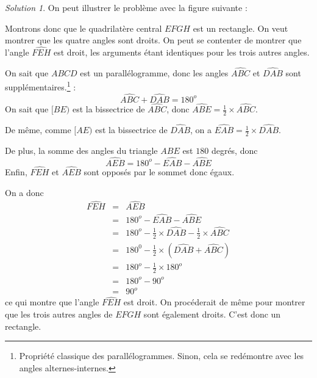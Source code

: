 \documentclass[14pt]{article}
\theoremstyle{remark}
\newtheorem*{sol}{Solution}
\newcounter{n}
\theoremstyle{plain}
\begin{document}
\begin{sol}
On peut illustrer le problème avec la figure suivante : 

\begin{figure}[H]\center
{}
\end{figure}

Montrons donc que le quadrilatère central $EFGH$ est un rectangle. On veut montrer que les quatre angles sont droits. On peut se contenter de montrer que l'angle $\widehat{FEH}$ est droit, les arguments étant identiques pour les trois autres angles.

On sait que $ABCD$ est un parallélogramme, donc les angles $\widehat{ABC}$ et $\widehat{DAB}$ sont supplémentaires.\footnote{Propriété classique des parallélogrammes. Sinon, cela se redémontre avec les angles alternes-internes.} : 
\[ \widehat{ABC}+\widehat{DAB}=180^o\]
On sait que $[BE)$ est la bissectrice de $\widehat{ABC}$, donc $\widehat{ABE}= \frac12\times \widehat{ABC}$. 

De même, comme $[AE)$ est la bissectrice de $\widehat{DAB}$, on a $\widehat{EAB} =\frac12\times \widehat{DAB}$.

De plus, la somme des angles du triangle $ABE$ est $180$ degrés, donc 
 \[\widehat{AEB}= 180^o-\widehat{EAB}-\widehat{ABE}\]
 Enfin, $\widehat{FEH}$ et $\widehat{AEB}$ sont opposés par le sommet donc égaux.
 
On a donc \begin{eqnarray*}
\widehat{FEH} &=& \widehat{AEB}\\
&=& 180^o-\widehat{EAB}-\widehat{ABE}\\
&=& 180^o - \frac12\times \widehat{DAB}- \frac12\times\widehat{ABC}\\
&=& 180^0-\frac12\times(\widehat{DAB}+\widehat{ABC}) \\
&=& 180^o - \frac12 \times 180^o\\
&=& 180^o- 90^o\\
&=& 90^o\end{eqnarray*} ce qui montre que l'angle $\widehat{FEH}$ est droit. On procéderait de même pour montrer que les trois autres angles de $EFGH$ sont également droits. C'est donc un rectangle.
\end{sol}
\end{document}
